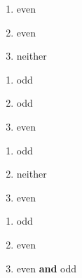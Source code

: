 \documentclass{ximera}
\begin{document}
\begin{multicols}{3}
\begin{enumerate}
\setcounter{enumi}{\value{HW}}

\item even
\item even
\item neither

\setcounter{HW}{\value{enumi}}
\end{enumerate}
\end{multicols}


\begin{multicols}{3}
\begin{enumerate}
\setcounter{enumi}{\value{HW}}

\item odd
\item odd
\item even

\setcounter{HW}{\value{enumi}}
\end{enumerate}
\end{multicols}

\begin{multicols}{3}
\begin{enumerate}
\setcounter{enumi}{\value{HW}}

\item odd
\item neither
\item even

\setcounter{HW}{\value{enumi}}
\end{enumerate}
\end{multicols}

\begin{multicols}{3}
\begin{enumerate}
\setcounter{enumi}{\value{HW}}

\item odd
\item even
\item even  \textbf{and} odd

\setcounter{HW}{\value{enumi}}
\end{enumerate}
\end{multicols}
\end{document}
